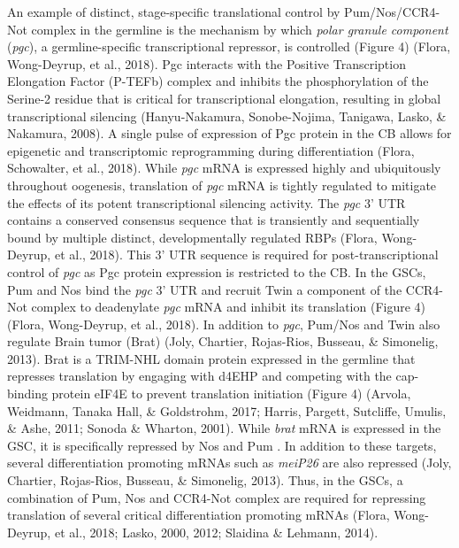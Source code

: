 \documentclass[12pt,oneside]{reedthesis}
\begin{document}
An example of distinct, stage-specific translational control by
Pum/Nos/CCR4-Not complex in the germline is the mechanism by which
\emph{polar granule component} (\emph{pgc}), a germline-specific transcriptional
repressor, is controlled (Figure 4) (Flora, Wong-Deyrup, et al., 2018). Pgc interacts with
the Positive Transcription Elongation Factor (P-TEFb) complex and
inhibits the phosphorylation of the Serine-2 residue that is critical
for transcriptional elongation, resulting in global transcriptional
silencing (Hanyu-Nakamura, Sonobe-Nojima, Tanigawa, Lasko, \& Nakamura, 2008). A single pulse of expression of Pgc
protein in the CB allows for epigenetic and transcriptomic reprogramming
during differentiation (Flora, Schowalter, et al., 2018). While \emph{pgc} mRNA is expressed
highly and ubiquitously throughout oogenesis, translation of \emph{pgc} mRNA
is tightly regulated to mitigate the effects of its potent
transcriptional silencing activity. The \emph{pgc} 3' UTR contains a
conserved consensus sequence that is transiently and sequentially bound
by multiple distinct, developmentally regulated RBPs (Flora, Wong-Deyrup, et al., 2018).
This 3' UTR sequence is required for post-transcriptional control of
\emph{pgc} as Pgc protein expression is restricted to the CB. In the GSCs,
Pum and Nos bind the \emph{pgc} 3' UTR and recruit Twin a component of the
CCR4-Not complex to deadenylate \emph{pgc} mRNA and inhibit its translation
(Figure 4) (Flora, Wong-Deyrup, et al., 2018). In addition to \emph{pgc}, Pum/Nos and Twin also
regulate Brain tumor (Brat) (Joly, Chartier, Rojas-Rios, Busseau, \& Simonelig, 2013). Brat is a TRIM-NHL domain
protein expressed in the germline that represses translation by engaging
with d4EHP and competing with the cap-binding protein eIF4E to prevent
translation initiation (Figure 4) (Arvola, Weidmann, Tanaka Hall, \& Goldstrohm, 2017; Harris, Pargett, Sutcliffe, Umulis, \& Ashe, 2011; Sonoda \& Wharton, 2001). While \emph{brat} mRNA is expressed in the GSC, it is
specifically repressed by Nos and Pum . In addition to these targets,
several differentiation promoting mRNAs such as \emph{meiP26} are also
repressed (Joly, Chartier, Rojas-Rios, Busseau, \& Simonelig, 2013). Thus, in the GSCs, a combination of Pum, Nos
and CCR4-Not complex are required for repressing translation of several
critical differentiation promoting mRNAs (Flora, Wong-Deyrup, et al., 2018; Lasko, 2000, 2012; Slaidina \& Lehmann, 2014).
\end{document}
